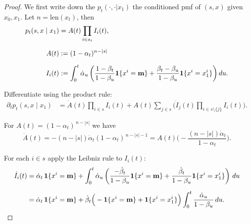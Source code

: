 \begin{proof}
We first write down the $p_t(\cdot, \cdot | x_1)$ the conditioned pmf of $(s, x)$ given $x_0, x_1$. Let $n = \text{len}(x_t)$, then
\begin{align*}
p_t(s,x \mid x_1) &= A(t)\prod_{i\in s_t} I_i(t), \\[6pt]
A(t) &:= (1-\alpha_t)^{n-|s|} \\[6pt]
I_i(t) &:= \int_0^t \dot\alpha_u\left(\frac{1-\beta_t}{1-\beta_u}\mathbf{1}\{x^i=\mathbf{m}\}
+ \frac{\beta_t-\beta_u}{1-\beta_u}\mathbf{1}\{x^i=x_1^i\}\right)du.
\end{align*}

Differentiate using the product rule:
\begin{align*}
\partial_t p_t(s,x\mid x_1)
&=\dot A(t)\prod_{i\in s}I_i(t)
+ A(t)\sum_{j\in s}\Big(\dot I_j(t)\prod_{i\in s\setminus\{j\}}I_i(t)\Big).
\end{align*}

For \(A(t)=(1-\alpha_t)^{\,n-|s|}\) we have
\[
\dot A(t)=-(n-|s|)\dot\alpha_t(1-\alpha_t)^{\,n-|s|-1}
= A(t)\Big(-\frac{(n-|s|)\dot\alpha_t}{1-\alpha_t}\Big).
\]

For each \(i\in s\) apply the Leibniz rule to \(I_i(t)\):
\begin{align*}
\dot I_i(t)
&=\dot\alpha_t\,\mathbf{1}\{x^i=\mathbf{m}\}
+\int_0^t \dot\alpha_u\left(
\frac{-\dot\beta_t}{1-\beta_u}\mathbf{1}\{x^i=\mathbf{m}\}
+\frac{\dot\beta_t}{1-\beta_u}\mathbf{1}\{x^i=x_1^i\}
\right)\,du\\[6pt]
&=\dot\alpha_t\,\mathbf{1}\{x^i=\mathbf{m}\}
+\dot\beta_t\Big(-\mathbf{1}\{x^i=\mathbf{m}\}+\mathbf{1}\{x^i=x_1^i\}\Big)
\int_0^t\frac{\dot\alpha_u}{1-\beta_u}\,du.
\end{align*}


\end{proof}
